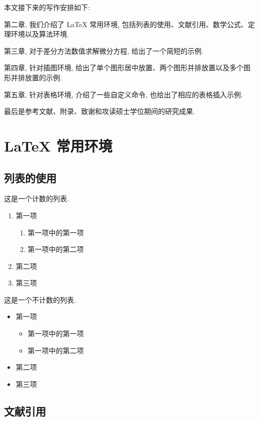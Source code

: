 \documentclass[UTF8,openany,twoside,12pt]{book}
\theoremstyle{plain}
\begin{document}
本文接下来的写作安排如下:

第二章, 我们介绍了 LaTeX 常用环境, 包括列表的使用、文献引用、数学公式、定理环境以及算法环境.

第三章, 对于差分方法数值求解微分方程, 给出了一个简短的示例.

第四章, 针对插图环境, 给出了单个图形居中放置、两个图形并排放置以及多个图形并排放置的示例.

第五章, 针对表格环境, 介绍了一些自定义命令, 也给出了相应的表格插入示例.

最后是参考文献、附录、致谢和攻读硕士学位期间的研究成果.




\chapter{LaTeX 常用环境}

\section{列表的使用}

这是一个计数的列表.
\begin{enumerate}%
	\item 第一项
		\begin{enumerate}
			\item 第一项中的第一项
			\item 第一项中的第二项
		\end{enumerate}
	\item 第二项
	\item 第三项
\end{enumerate}


这是一个不计数的列表.
\begin{itemize}%
	\item 第一项
	\begin{itemize}
		\item 第一项中的第一项
		\item 第一项中的第二项
	\end{itemize}
	\item 第二项
	\item 第三项
\end{itemize}


\section{文献引用}
\end{document}
